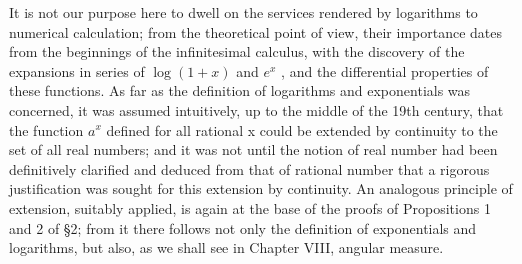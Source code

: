 It is not our purpose here to dwell on the services rendered by logarithms to numerical calculation; from the theoretical point of view, their importance dates from the beginnings of the infinitesimal calculus, with the discovery of the expansions in series of \(\log(1+x)\) and \(e^{x}\) , and the differential properties of these functions. As far as the definition of logarithms and exponentials was concerned, it was assumed intuitively, up to the middle of the 19th century, that the function \(a^{x}\) defined for all rational x could be extended by continuity to the set of all real numbers; and it was not until the notion of real number had been definitively clarified and deduced from that of rational number that a rigorous justification was sought for this extension by continuity. An analogous principle of extension, suitably applied, is again at the base of the proofs of Propositions 1 and 2 of §2; from it there follows not only the definition of exponentials and logarithms, but also, as we shall see in Chapter VIII, angular measure.

